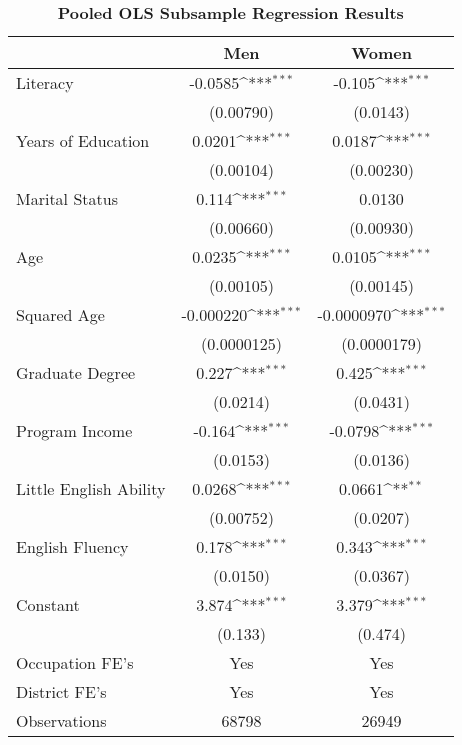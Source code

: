 \begin{table}[htbp]\centering
\def\sym#1{\ifmmode^{#1}\else\(^{#1}\)\fi}
\caption{\textbf{Pooled OLS Subsample Regression Results}}
\begin{tabular}{l*{2}{c}}
\hline\hline
                &\multicolumn{1}{c}{Men}&\multicolumn{1}{c}{Women}\\
\hline
Literacy        &  -0.0585\sym{***}&   -0.105\sym{***}\\
                &(0.00790)         & (0.0143)         \\
[1em]
Years of Education&   0.0201\sym{***}&   0.0187\sym{***}\\
                &(0.00104)         &(0.00230)         \\
[1em]
Marital Status  &    0.114\sym{***}&   0.0130         \\
                &(0.00660)         &(0.00930)         \\
[1em]
Age             &   0.0235\sym{***}&   0.0105\sym{***}\\
                &(0.00105)         &(0.00145)         \\
[1em]
Squared Age     &-0.000220\sym{***}&-0.0000970\sym{***}\\
                &(0.0000125)         &(0.0000179)         \\
[1em]
Graduate Degree &    0.227\sym{***}&    0.425\sym{***}\\
                & (0.0214)         & (0.0431)         \\
[1em]
Program Income  &   -0.164\sym{***}&  -0.0798\sym{***}\\
                & (0.0153)         & (0.0136)         \\
[1em]
Little English Ability&   0.0268\sym{***}&   0.0661\sym{**} \\
                &(0.00752)         & (0.0207)         \\
[1em]
English Fluency &    0.178\sym{***}&    0.343\sym{***}\\
                & (0.0150)         & (0.0367)         \\
[1em]
Constant        &    3.874\sym{***}&    3.379\sym{***}\\
                &  (0.133)         &  (0.474)         \\
[1em]
Occupation FE's &      Yes         &      Yes         \\
[1em]
District FE's   &      Yes         &      Yes         \\
\hline
Observations    &    68798         &    26949         \\

\end{tabular}
\end{table}
